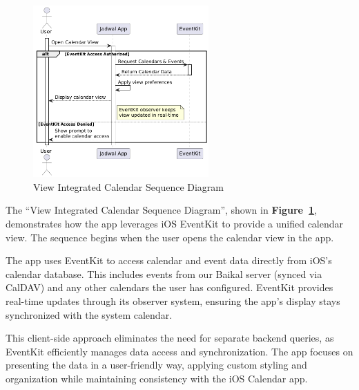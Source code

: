 \begin{figure}[!h]
  \centering
  \includegraphics[width=0.6\textwidth]{images/docs/diagrams/sequence-diagrams/all-sequence-diagrams/View Integrated Calendar.png}
  \caption{View Integrated Calendar Sequence Diagram}
  \label{fig:seq/view-integrated-calendar}
\end{figure}

The ``View Integrated Calendar Sequence Diagram'', shown in \textbf{Figure~\ref{fig:seq/view-integrated-calendar}}, demonstrates how the app leverages iOS EventKit to provide a unified calendar view. The sequence begins when the user opens the calendar view in the app.

The app uses EventKit to access calendar and event data directly from iOS's calendar database. This includes events from our Baikal server (synced via CalDAV) and any other calendars the user has configured. EventKit provides real-time updates through its observer system, ensuring the app's display stays synchronized with the system calendar.

This client-side approach eliminates the need for separate backend queries, as EventKit efficiently manages data access and synchronization. The app focuses on presenting the data in a user-friendly way, applying custom styling and organization while maintaining consistency with the iOS Calendar app.